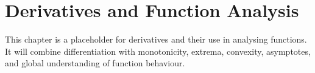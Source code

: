 \chapter{Derivatives and Function Analysis}

This chapter is a placeholder for derivatives and their use in analysing functions. It will combine differentiation with monotonicity, extrema, convexity, asymptotes, and global understanding of function behaviour.
